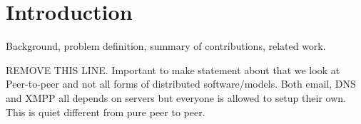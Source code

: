\section{Introduction}
Background, problem definition, summary of contributions, related work.

REMOVE THIS LINE. Important to make statement about that we look at Peer-to-peer and not all forms of distributed software/models. Both email, DNS and XMPP all depends on servers but everyone is allowed to setup their own. This is quiet different from pure peer to peer.

